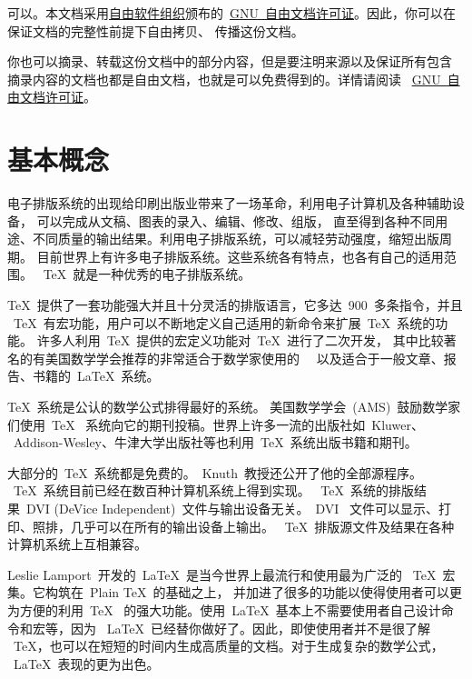 \documentclass[a4paper]{article}
\begin{document}

可以。本文档采用\href{http://www.gnu.org}
{自由软件组织}颁布的~\href{http://www.gnu.org/licenses/fdl.html}
{GNU~自由文档许可证}。因此，你可以在保证文档的完整性前提下自由拷贝、
传播这份文档。

你也可以摘录、转载这份文档中的部分内容，但是要注明来源以及保证所有包含
摘录内容的文档也都是自由文档，也就是可以免费得到的。详情请阅读
~\href{http://www.gnu.org/licenses/fdl.html}{GNU~自由文档许可证}。

\section{基本概念}


电子排版系统的出现给印刷出版业带来了一场革命，利用电子计算机及各种辅助设备，
可以完成从文稿、图表的录入、编辑、修改、组版，
直至得到各种不同用途、不同质量的输出结果。利用电子排版系统，可以减轻劳动强度，缩短出版周期。
目前世界上有许多电子排版系统。这些系统各有特点，也各有自己的适用范围。
~\TeX{}~就是一种优秀的电子排版系统。

\TeX{}~提供了一套功能强大并且十分灵活的排版语言，它多达~900~多条指令，并且
~\TeX{}~有宏功能，用户可以不断地定义自己适用的新命令来扩展~\TeX{}~系统的功能。
许多人利用~\TeX{}~提供的宏定义功能对~\TeX{}~进行了二次开发，
其中比较著名的有美国数学学会推荐的非常适合于数学家使用的~\AMSTeX{}~
以及适合于一般文章、报告、书籍的~\LaTeX{}~系统。

\TeX{}~系统是公认的数学公式排得最好的系统。
美国数学学会~(AMS)~鼓励数学家们使用~\TeX{}~
系统向它的期刊投稿。世界上许多一流的出版社如~Kluwer、
~Addison-Wesley、牛津大学出版社等也利用~\TeX{}~系统出版书籍和期刊。

大部分的~\TeX{}~系统都是免费的。~Knuth~教授还公开了他的全部源程序。
~\TeX{}~系统目前已经在数百种计算机系统上得到实现。
~\TeX{}~系统的排版结果~DVI (DeVice
Independent)~文件与输出设备无关。~DVI~
文件可以显示、打印、照排，几乎可以在所有的输出设备上输出。
~\TeX{}~排版源文件及结果在各种计算机系统上互相兼容。


Leslie Lamport~开发的~\LaTeX{}~是当今世界上最流行和使用最为广泛的
~\TeX{}~宏集。它构筑在~Plain \TeX{}~的基础之上，
并加进了很多的功能以使得使用者可以更为方便的利用~\TeX{}~
的强大功能。使用~\LaTeX{}~基本上不需要使用者自己设计命令和宏等，因为
~\LaTeX{}~已经替你做好了。因此，即使使用者并不是很了解
~\TeX{}，也可以在短短的时间内生成高质量的文档。对于生成复杂的数学公式，
~\LaTeX{}~表现的更为出色。
\end{document}
